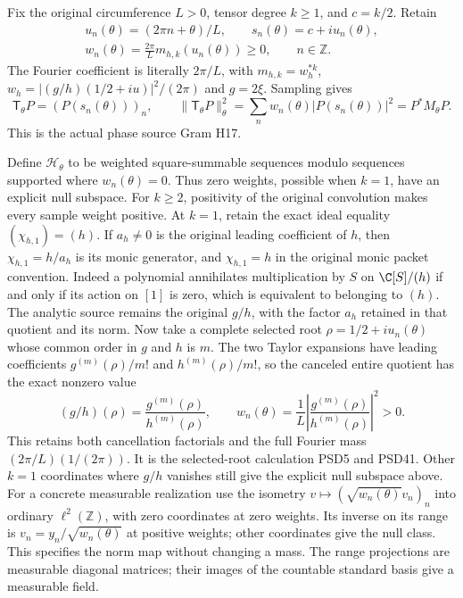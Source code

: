 Fix the original circumference $L>0$, tensor degree $k\ge1$,
and $c=k/2$. Retain
\[
 \begin{gathered}
 u_n(\theta)=(2\pi n+\theta)/L,\qquad
 s_n(\theta)=c+iu_n(\theta),\\
 w_n(\theta)=\frac{2\pi}{L}m_{h,k}(u_n(\theta))\ge0,
 \qquad n\in\mathbb Z.
 \end{gathered}
 \tag{HCD17}
\]
The Fourier coefficient is literally $2\pi/L$, with
$m_{h,k}=w_h^{*k}$, $w_h=|(g/h)(1/2+iu)|^2/(2\pi)$
and $g=2\xi$. Sampling gives
\[
 \mathsf T_\theta P=(P(s_n(\theta)))_n,\qquad
 \|\mathsf T_\theta P\|_\theta^2
 =\sum_n w_n(\theta)|P(s_n(\theta))|^2=P^*M_\theta P.
 \tag{HCD18}
\]
This is the actual phase source Gram H17.

Define $\mathcal H_\theta$ to be weighted square-summable
sequences modulo sequences supported where $w_n(\theta)=0$.
Thus zero weights, possible when $k=1$, have an explicit
null subspace. For $k\ge2$, positivity of the original
convolution makes every sample weight positive.
At $k=1$, retain the exact ideal equality
$(\chi_{h,1})=(h)$. If $a_h\ne0$ is the original leading
coefficient of $h$, then $\chi_{h,1}=h/a_h$ is its monic
generator, and $\chi_{h,1}=h$ in the original monic packet
convention. Indeed a polynomial annihilates multiplication by
$S$ on $\C[S]/(h)$ if and only if its action on $[1]$ is
zero, which is equivalent to belonging to $(h)$.
The analytic source remains the original $g/h$, with
the factor $a_h$ retained in that quotient and its norm.
Now take a complete selected root
$\rho=1/2+iu_n(\theta)$ whose common order in $g$ and $h$
is $m$. The two Taylor expansions have leading coefficients
$g^{(m)}(\rho)/m!$ and $h^{(m)}(\rho)/m!$, so the canceled
entire quotient has the exact nonzero value
\[
 (g/h)(\rho)=\frac{g^{(m)}(\rho)}{h^{(m)}(\rho)},\qquad
 w_n(\theta)=\frac1L
 \left|\frac{g^{(m)}(\rho)}{h^{(m)}(\rho)}\right|^2>0.
 \tag{HCD18a}
\]
This retains both cancellation factorials and the full
Fourier mass $(2\pi/L)(1/(2\pi))$. It is the selected-root
calculation PSD5 and PSD41. Other $k=1$ coordinates where
$g/h$ vanishes still give the explicit null subspace above.
For a concrete measurable realization use the isometry
$v\mapsto(\sqrt{w_n(\theta)}v_n)_n$ into ordinary
$\ell^2(\mathbb Z)$, with zero coordinates at zero weights.
Its inverse on its range is
$v_n=y_n/\sqrt{w_n(\theta)}$ at positive weights; other
coordinates give the null class. This specifies the norm
map without changing a mass. The range projections are
measurable diagonal matrices; their images of the countable
standard basis give a measurable field.

